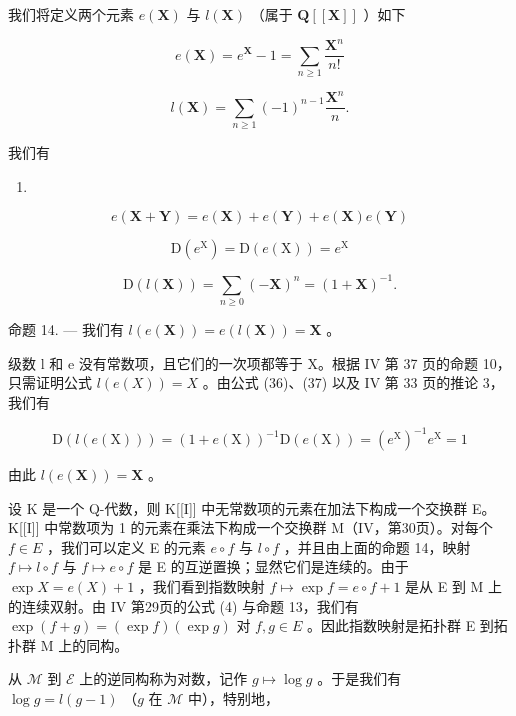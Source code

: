 我们将定义两个元素 \(e(\mathbf{X})\) 与 \(l(\mathbf{X})\) （属于 \(\mathbf{Q}[[\mathbf{X}]]\) ）如下

\[
e (\mathbf {X}) = e ^ {\mathbf {X}} - 1 = \sum_ {n \geqslant 1} \frac {\mathbf {X} ^ {n}}{n !}\tag{33}
\]

\[
l (\mathbf {X}) = \sum_ {n \geqslant 1} (- 1) ^ {n - 1} \frac {\mathbf {X} ^ {n}}{n}.\tag{34}
\]

我们有

\begin{enumerate}
\def\labelenumi{(\arabic{enumi})}
\setcounter{enumi}{34}
\tightlist
\item
\end{enumerate}

\[
e (\mathbf {X} + \mathbf {Y}) = e (\mathbf {X}) + e (\mathbf {Y}) + e (\mathbf {X}) e (\mathbf {Y})
\]

\[
\mathrm{D} (e ^ {\mathrm{X}}) = \mathrm{D} (e (\mathrm{X})) = e ^ {\mathrm{X}}\tag{36}
\]

\[
\mathrm{D} (l (\mathbf {X})) = \sum_ {n \geqslant 0} (- \mathbf {X}) ^ {n} = (1 + \mathbf {X}) ^ {- 1}.\tag{37}
\]

命题 14. --- 我们有 \(l(e(\mathbf{X})) = e(l(\mathbf{X})) = \mathbf{X}\) 。

级数 l 和 e 没有常数项，且它们的一次项都等于 X。根据 IV 第 37 页的命题 10，只需证明公式 \(l(e(X)) = X\) 。由公式 (36)、(37) 以及 IV 第 33 页的推论 3，我们有

\[
\mathrm{D} (l (e (\mathrm{X}))) = (1 + e (\mathrm{X})) ^ {- 1} \mathrm{D} (e (\mathrm{X})) = (e ^ {\mathrm{X}}) ^ {- 1} e ^ {\mathrm{X}} = 1
\]

由此 \(l(e(\mathbf{X})) = \mathbf{X}\) 。

设 K 是一个 Q-代数，则 K{[}{[}I{]}{]} 中无常数项的元素在加法下构成一个交换群 E。K{[}{[}I{]}{]} 中常数项为 1 的元素在乘法下构成一个交换群 M（IV，第30页）。对每个 \(f \in E\) ，我们可以定义 E 的元素 \(e \circ f\) 与 \(l \circ f\) ，并且由上面的命题 14，映射 \(f \mapsto l \circ f\) 与 \(f \mapsto e \circ f\) 是 E 的互逆置换；显然它们是连续的。由于 \(\exp X = e(X) + 1\) ，我们看到指数映射 \(f \mapsto \exp f = e \circ f + 1\) 是从 E 到 M 上的连续双射。由 IV 第29页的公式 (4) 与命题 13，我们有 \(\exp(f + g) = (\exp f)(\exp g)\) 对 \(f, g \in E\) 。因此指数映射是拓扑群 E 到拓扑群 M 上的同构。

从 \(\mathcal{M}\) 到 \(\mathcal{E}\) 上的逆同构称为对数，记作 \(g \mapsto \log g\) 。于是我们有 \(\log g = l(g - 1)\) （\(g\) 在 \(\mathcal{M}\) 中），特别地，

